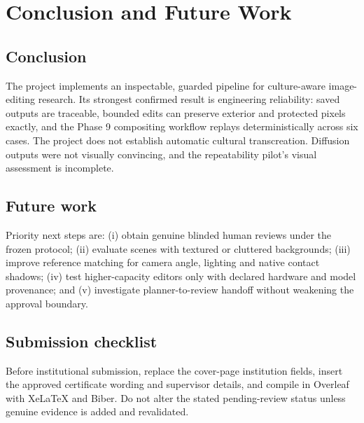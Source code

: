 \chapter{Conclusion and Future Work}
\label{ch:conclusion}
\section{Conclusion}
The project implements an inspectable, guarded pipeline for culture-aware image-editing research. Its strongest confirmed result is engineering reliability: saved outputs are traceable, bounded edits can preserve exterior and protected pixels exactly, and the Phase 9 compositing workflow replays deterministically across six cases. The project does not establish automatic cultural transcreation. Diffusion outputs were not visually convincing, and the repeatability pilot's visual assessment is incomplete.

\section{Future work}
Priority next steps are: (i) obtain genuine blinded human reviews under the frozen protocol; (ii) evaluate scenes with textured or cluttered backgrounds; (iii) improve reference matching for camera angle, lighting and native contact shadows; (iv) test higher-capacity editors only with declared hardware and model provenance; and (v) investigate planner-to-review handoff without weakening the approval boundary.

\section{Submission checklist}
Before institutional submission, replace the cover-page institution fields, insert the approved certificate wording and supervisor details, and compile in Overleaf with XeLaTeX and Biber. Do not alter the stated pending-review status unless genuine evidence is added and revalidated.
